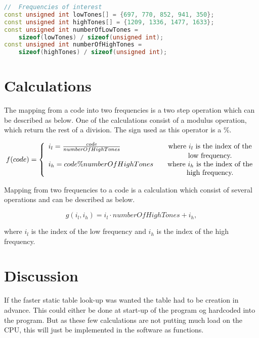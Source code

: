 	\begin{lstlisting}[float=!h,language={C++},caption={Implementation of tone arrays},label={app_dtmf:tone_array_listing}]
//	Frequencies of interest
const unsigned int lowTones[] = {697, 770, 852, 941, 350};
const unsigned int highTones[] = {1209, 1336, 1477, 1633};
const unsigned int numberOfLowTones =
	sizeof(lowTones) / sizeof(unsigned int);
const unsigned int numberOfHighTones =
	sizeof(highTones) / sizeof(unsigned int);
	\end{lstlisting}
	
	\section{Calculations}
	The mapping from a code into two frequencies is a two step operation which can be described as below. One of the calculations consist of a modulus operation, which return the rest of a division. The sign used as this operator is a \%.
	
	\[
		f(code) = \left\{ 
		\begin{array}{l c}
			i_{l} = \frac{code}{numberOfHighTones} & \quad \text{where $i_{l}$ is the index of the}\\
			& \quad \text{low frequency.}\\
			i_{h} = code \% numberOfHighTones & \quad \text{where $i_{h}$ is the index of the}\\
						& \quad \text{high frequency.}\\
		\end{array} \right.
	\]
	
	Mapping from two frequencies to a code is a calculation which consist of several operations and can be described as below.
	
	\[
		g(i_{l}, i_{h}) = i_{l} \cdot numberOfHighTones + i_{h},
	\]
	
	where $i_{l}$ is the index of the low frequency and $i_{h}$ is the index of the high frequency.
	
	\section{Discussion}
	If the faster static table look-up was wanted the table had to be creation in advance. This could either be done at start-up of the program og hardcoded into the program. But as these few calculations are not putting much load on the CPU, this will just be implemented in the software as functions.